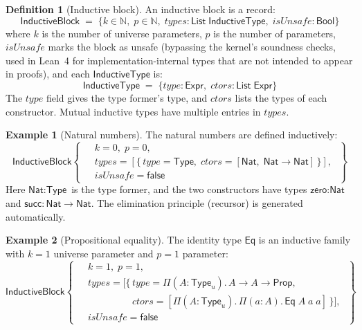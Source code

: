 \documentclass[11pt]{article}
\theoremstyle{definition}
\newtheorem{definition}{Definition}[section]
\newtheorem{example}{Example}[section]
\theoremstyle{plain}
\theoremstyle{remark}
\newcommand{\Prop}{\textsf{Prop}}
\newcommand{\Type}{\textsf{Type}}
\newcommand{\Nat}{\textsf{Nat}}
\newcommand{\Eq}{\textsf{Eq}}
\begin{document}
\begin{definition}[Inductive block]
\label{def:inductive-block}
An inductive block is a record:
\[
  \textsf{InductiveBlock} \;=\; \{
    k \in \mathbb{N},\;
    p \in \mathbb{N},\;
    \mathit{types} : \textsf{List}\;\textsf{InductiveType},\;
    \mathit{isUnsafe} : \textsf{Bool}
  \}
\]
where $k$ is the number of universe parameters, $p$ is the number of parameters,
$\mathit{isUnsafe}$ marks the block as unsafe (bypassing the kernel's soundness checks,
used in Lean~4 for implementation-internal types that are not intended to appear in proofs),
and each
$\textsf{InductiveType}$ is:
\[
  \textsf{InductiveType} \;=\; \{
    \mathit{type} : \textsf{Expr},\;
    \mathit{ctors} : \textsf{List}\;\textsf{Expr}
  \}
\]
The $\mathit{type}$ field gives the type former's type, and $\mathit{ctors}$ lists the types
of each constructor.
Mutual inductive types have multiple entries in $\mathit{types}$.
\end{definition}

\begin{example}[Natural numbers]
The natural numbers are defined inductively:
\[
  \textsf{InductiveBlock}\!\left\{\;
    \begin{aligned}
      &k=0,\; p=0, \\
      &\mathit{types} = [\{\,
        \mathit{type} = \Type,\;
        \mathit{ctors} = [\Nat,\; \Nat \to \Nat]
      \,\}], \\
      &\mathit{isUnsafe} = \textsf{false}
    \end{aligned}
  \;\right\}
\]
Here $\Nat : \Type$ is the type former, and the two constructors have types
$\textsf{zero} : \Nat$ and $\textsf{succ} : \Nat \to \Nat$.
The elimination principle (recursor) is generated automatically.
\end{example}

\begin{example}[Propositional equality]
The identity type $\Eq$ is an inductive family with $k=1$ universe parameter and $p=1$ parameter:
\[
  \textsf{InductiveBlock}\!\left\{\;
    \begin{aligned}
      &k=1,\; p=1, \\
      &\mathit{types} = [\{\,
        \mathit{type} = \Pi(A{:}\Type_u).\,A \to A \to \Prop, \\
      &\phantom{\mathit{types} = [\{\,}
        \mathit{ctors} = [\Pi(A{:}\Type_u).\,\Pi(a{:}A).\,\Eq\;A\;a\;a]
      \,\}], \\
      &\mathit{isUnsafe} = \textsf{false}
    \end{aligned}
  \;\right\}
\]
\end{example}
\end{document}
